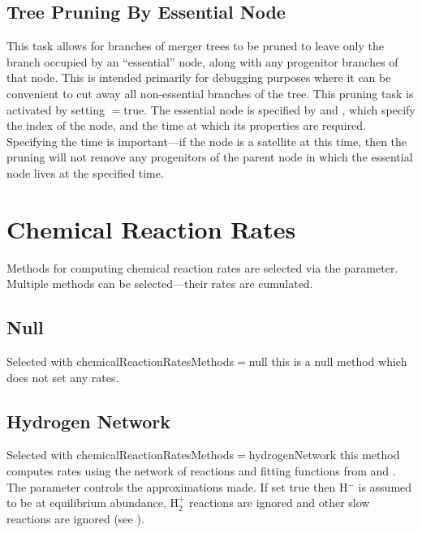 \subsection{Tree Pruning By Essential Node}

This task allows for branches of merger trees to be pruned to leave only the branch occupied by an ``essential'' node, along with any progenitor branches of that node. This is intended primarily for debugging purposes where it can be convenient to cut away all non-essential branches of the tree. This pruning task is activated by setting {\normalfont \ttfamily [mergerTreePruneNonEssential]}$=${\normalfont \ttfamily true}. The essential node is specified by {\normalfont \ttfamily [mergerTreePruningNonEssentialID]} and {\normalfont \ttfamily [mergerTreePruningNonEssentialTime]}, which specify the index of the node, and the time at which its properties are required. Specifying the time is important---if the node is a satellite at this time, then the pruning will not remove any progenitors of the parent node in which the essential node lives at the specified time.

\section{Chemical Reaction Rates}\label{sec:ChemicalReactionRates}

Methods for computing chemical reaction rates are selected via the {\normalfont \ttfamily [chemicalReactionRatesMethods]} parameter. Multiple methods can be selected---their rates are cumulated.

\subsection{Null}

Selected with {\normalfont \ttfamily chemicalReactionRatesMethods}$=${\normalfont \ttfamily null} this is a null method which does not set any rates.

\subsection{Hydrogen Network}

Selected with {\normalfont \ttfamily chemicalReactionRatesMethods}$=${\normalfont \ttfamily hydrogenNetwork} this method computes rates using the network of reactions and fitting functions from \cite{abel_modeling_1997} and \cite{tegmark_small_1997}. The parameter {\normalfont \ttfamily [hydrogenNetworkFast]} controls the approximations made. If set {\normalfont \ttfamily true} then H$^-$ is assumed to be at equilibrium abundance, H$_2^+$ reactions are ignored and other slow reactions are ignored (see \citealt{abel_modeling_1997}).

